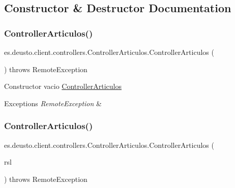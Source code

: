 \subsection{Constructor \& Destructor Documentation}
\mbox{\label{classes_1_1deusto_1_1client_1_1controllers_1_1_controller_articulos_abce7824d661f6d557576ff1b382702ab}} 
\subsubsection{\texorpdfstring{ControllerArticulos()}{ControllerArticulos()}\hspace{0.1cm}{\footnotesize\ttfamily [1/2]}}
{\footnotesize\ttfamily es.\+deusto.\+client.\+controllers.\+Controller\+Articulos.\+Controller\+Articulos (\begin{DoxyParamCaption}{ }\end{DoxyParamCaption}) throws Remote\+Exception}

Constructor vacio \mbox{\hyperlink{classes_1_1deusto_1_1client_1_1controllers_1_1_controller_articulos}{Controller\+Articulos}} 
\begin{DoxyExceptions}{Exceptions}
{\em Remote\+Exception} & \\
\hline
\end{DoxyExceptions}
\mbox{\label{classes_1_1deusto_1_1client_1_1controllers_1_1_controller_articulos_aa0881e299b84ac2ddde4203b67c91a60}} 
\subsubsection{\texorpdfstring{ControllerArticulos()}{ControllerArticulos()}\hspace{0.1cm}{\footnotesize\ttfamily [2/2]}}
{\footnotesize\ttfamily es.\+deusto.\+client.\+controllers.\+Controller\+Articulos.\+Controller\+Articulos (\begin{DoxyParamCaption}\item[{\mbox{\hyperlink{classes_1_1deusto_1_1client_1_1remote_1_1_service_locator}{Service\+Locator}}}]{rsl }\end{DoxyParamCaption}) throws Remote\+Exception}

